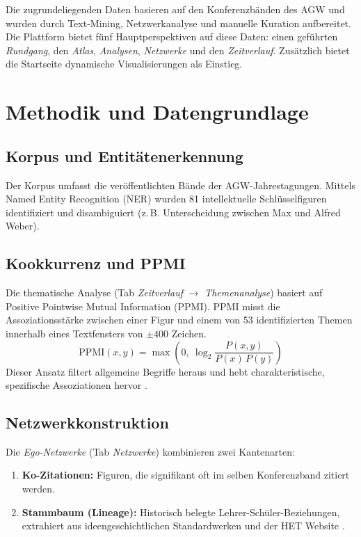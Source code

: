 \documentclass[11pt,a4paper,twoside]{article}
\begin{document}
Die zugrundeliegenden Daten basieren auf den Konferenzbänden des AGW und wurden durch Text-Mining, Netzwerkanalyse und manuelle Kuration aufbereitet. Die Plattform bietet fünf Hauptperspektiven auf diese Daten: einen geführten \textit{Rundgang}, den \textit{Atlas}, \textit{Analysen}, \textit{Netzwerke} und den \textit{Zeitverlauf}. Zusätzlich bietet die Startseite dynamische Visualisierungen als Einstieg.

\section{Methodik und Datengrundlage}
\subsection{Korpus und Entitätenerkennung}
Der Korpus umfasst die veröffentlichten Bände der AGW-Jahrestagungen. Mittels Named Entity Recognition (NER) wurden 81 intellektuelle Schlüsselfiguren identifiziert und disambiguiert (z.\,B. Unterscheidung zwischen Max und Alfred Weber).

\subsection{Kookkurrenz und PPMI}
Die thematische Analyse (Tab \textit{Zeitverlauf} $\rightarrow$ \textit{Themenanalyse}) basiert auf Positive Pointwise Mutual Information (PPMI). PPMI misst die Assoziationsstärke zwischen einer Figur und einem von 53 identifizierten Themen innerhalb eines Textfensters von $\pm 400$ Zeichen.
\begin{equation}
    \mathrm{PPMI}(x,y) = \max\!\left(0,\ \log_2 \frac{P(x,y)}{P(x)\,P(y)}\right)
\end{equation}
Dieser Ansatz filtert allgemeine Begriffe heraus und hebt charakteristische, spezifische Assoziationen hervor \cite{jurafsky2000}.

\subsection{Netzwerkkonstruktion}
Die \textit{Ego-Netzwerke} (Tab \textit{Netzwerke}) kombinieren zwei Kantenarten:
\begin{enumerate}[leftmargin=*,itemsep=2pt,topsep=2pt]
    \item \textbf{Ko-Zitationen:} Figuren, die signifikant oft im selben Konferenzband zitiert werden.
    \item \textbf{Stammbaum (Lineage):} Historisch belegte Lehrer-Schüler-Beziehungen, extrahiert aus ideengeschichtlichen Standardwerken und der HET Website \cite{hetwebsite}.
\end{enumerate}
\end{document}
